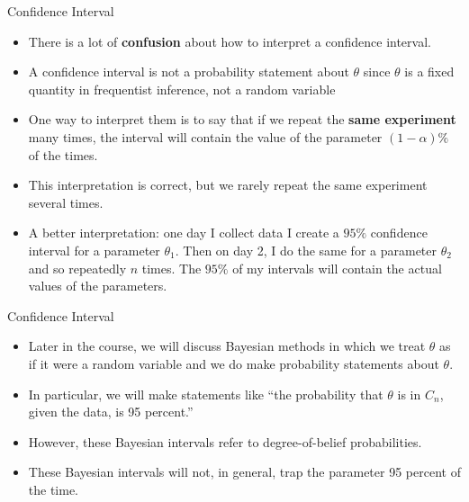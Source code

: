 \documentclass[handout]{beamer}
\begin{document}
\begin{frame}{Confidence Interval}
\scriptsize{


\begin{itemize}
 \item There is a lot of \textbf{confusion} about how to interpret a confidence interval.
 \item A confidence interval is not a probability statement about $\theta$ since $\theta$ is a fixed quantity in frequentist inference, not a random variable
 \item One way to interpret them is to say that if we repeat the \textbf{same experiment} many times, the interval will contain the value of the parameter $(1-\alpha)\%$ of the times.
 \item This interpretation is correct, but we rarely repeat the same experiment several times.
 \item A better interpretation: one day I collect data I create a $95\%$ confidence interval for a parameter $\theta_1$. Then on day 2, I do the same for a parameter $\theta_2$ and so repeatedly $n$ times. The $95\%$ of my intervals will contain the actual values of the parameters. 
 
\end{itemize}



}
 
\end{frame}




\begin{frame}{Confidence Interval}
\scriptsize{


\begin{itemize}
 \item Later in the course, we will discuss Bayesian methods in which we treat $\theta$ as if it were a random variable and we do make probability statements about $\theta$.
\item In particular, we will make statements like ``the probability that $\theta$  is in $C_n$, given the data, is 95 percent.''
\item However, these Bayesian intervals refer to degree-of-belief probabilities. 
\item These Bayesian intervals will not, in general, trap the parameter 95 percent of the time.
 
\end{itemize}



}
 
\end{frame}
\end{document}
